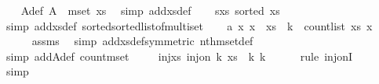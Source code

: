 \begin{isabellebody}
\isanewline
\ \ \isamarkupfalse%
\ A{\isacharunderscore}{\kern0pt}def{\isacharcolon}{\kern0pt}\ {\isachardoublequoteopen}A\ {\isacharequal}{\kern0pt}\ mset\ xs{\isachardoublequoteclose}\ \isamarkupfalse%
\ {\isacharparenleft}{\kern0pt}simp\ add{\isacharcolon}{\kern0pt}xs{\isacharunderscore}{\kern0pt}def{\isacharparenright}{\kern0pt}\isanewline
\ \ \isamarkupfalse%
\ s{\isacharunderscore}{\kern0pt}xs{\isacharcolon}{\kern0pt}\ {\isachardoublequoteopen}sorted\ xs{\isachardoublequoteclose}\ \isamarkupfalse%
\ {\isacharparenleft}{\kern0pt}simp\ add{\isacharcolon}{\kern0pt}xs{\isacharunderscore}{\kern0pt}def\ sorted{\isacharunderscore}{\kern0pt}sorted{\isacharunderscore}{\kern0pt}list{\isacharunderscore}{\kern0pt}of{\isacharunderscore}{\kern0pt}multiset{\isacharparenright}{\kern0pt}\isanewline
\ \ \isamarkupfalse%
\ a{\isacharunderscore}{\kern0pt}{}{\isacharcolon}{\kern0pt}\ {\isachardoublequoteopen}{\isasymAnd}x{\isachardot}{\kern0pt}\ x\ {\isasymle}\ xs\ {\isacharbang}{\kern0pt}\ k\ {\isasymLongrightarrow}\ count{\isacharunderscore}{\kern0pt}list\ xs\ x\ {\isasymle}\ {}{\isachardoublequoteclose}\ \isanewline
\ \ \ \ \isamarkupfalse%
\ assms{\isacharparenleft}{\kern0pt}{}{\isacharparenright}{\kern0pt}\ \isamarkupfalse%
\ {\isacharparenleft}{\kern0pt}simp\ add{\isacharcolon}{\kern0pt}xs{\isacharunderscore}{\kern0pt}def{\isacharbrackleft}{\kern0pt}symmetric{\isacharbrackright}{\kern0pt}\ nth{\isacharunderscore}{\kern0pt}mset{\isacharunderscore}{\kern0pt}def{\isacharparenright}{\kern0pt}\isanewline
\ \ \ \ \isamarkupfalse%
\ {\isacharparenleft}{\kern0pt}simp\ add{\isacharcolon}{\kern0pt}A{\isacharunderscore}{\kern0pt}def\ count{\isacharunderscore}{\kern0pt}mset{\isacharparenright}{\kern0pt}\ \isanewline
\isanewline
\ \ \isamarkupfalse%
\ inj{\isacharunderscore}{\kern0pt}xs{\isacharcolon}{\kern0pt}\ {\isachardoublequoteopen}inj{\isacharunderscore}{\kern0pt}on\ {\isacharparenleft}{\kern0pt}{\isasymlambda}k{\isachardot}{\kern0pt}\ xs\ {\isacharbang}{\kern0pt}\ k{\isacharparenright}{\kern0pt}\ {\isacharbraceleft}{\kern0pt}{}{\isachardot}{\kern0pt}{\isachardot}{\kern0pt}k{\isacharbraceright}{\kern0pt}{\isachardoublequoteclose}\isanewline
\ \ \ \ \isamarkupfalse%
\ {\isacharparenleft}{\kern0pt}rule\ inj{\isacharunderscore}{\kern0pt}onI{\isacharparenright}{\kern0pt}\isanewline
\ \ \ \ \isamarkupfalse%
\ simp\isanewline
\ \ \ \ \isamarkupfalse%

\end{isabellebody}
